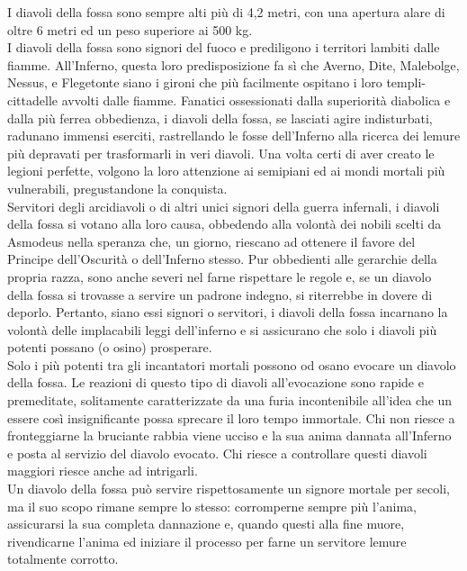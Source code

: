 \begin{multicols}{2}
I diavoli della fossa sono sempre alti più di 4,2 metri, con una apertura alare di oltre 6 metri ed un peso superiore ai 500 kg.\\

I diavoli della fossa sono signori del fuoco e prediligono i territori lambiti dalle fiamme. All'Inferno, questa loro predisposizione fa sì che Averno, Dite, Malebolge, Nessus, e Flegetonte siano i gironi che più facilmente ospitano i loro templi-cittadelle avvolti dalle fiamme. Fanatici ossessionati dalla superiorità diabolica e dalla più ferrea obbedienza, i diavoli della fossa, se lasciati agire indisturbati, radunano immensi eserciti, rastrellando le fosse dell'Inferno alla ricerca dei lemure più depravati per trasformarli in veri diavoli. Una volta certi di aver creato le legioni perfette, volgono la loro attenzione ai semipiani ed ai mondi mortali più vulnerabili, pregustandone la conquista.\\

Servitori degli arcidiavoli o di altri unici signori della guerra infernali, i diavoli della fossa si votano alla loro causa, obbedendo alla volontà dei nobili scelti da Asmodeus nella speranza che, un giorno, riescano ad ottenere il favore del Principe dell'Oscurità o dell'Inferno stesso. Pur obbedienti alle gerarchie della propria razza, sono anche severi nel farne rispettare le regole e, se un diavolo della fossa si trovasse a servire un padrone indegno, si riterrebbe in dovere di deporlo. Pertanto, siano essi signori o servitori, i diavoli della fossa incarnano la volontà delle implacabili leggi dell'inferno e si assicurano che solo i diavoli più potenti possano (o osino) prosperare.\\

Solo i più potenti tra gli incantatori mortali possono od osano evocare un diavolo della fossa. Le reazioni di questo tipo di diavoli all'evocazione sono rapide e premeditate, solitamente caratterizzate da una furia incontenibile all'idea che un essere così insignificante possa sprecare il loro tempo immortale. Chi non riesce a fronteggiarne la bruciante rabbia viene ucciso e la sua anima dannata all'Inferno e posta al servizio del diavolo evocato. Chi riesce a controllare questi diavoli maggiori riesce anche ad intrigarli.\\

Un diavolo della fossa può servire rispettosamente un signore mortale per secoli, ma il suo scopo rimane sempre lo stesso: corromperne sempre più l'anima, assicurarsi la sua completa dannazione e, quando questi alla fine muore, rivendicarne l'anima ed iniziare il processo per farne un servitore lemure totalmente corrotto.\\


\end{multicols}
